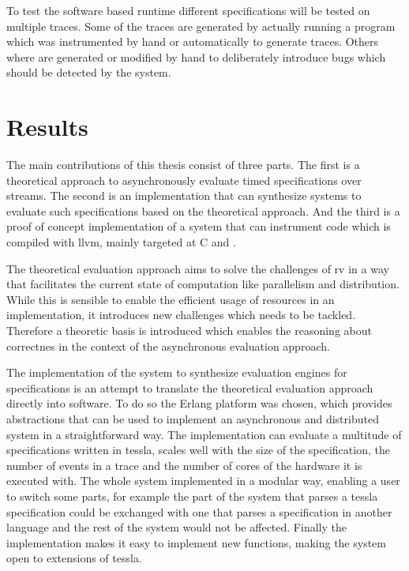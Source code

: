 To test the software based runtime different specifications will be tested on multiple traces.
Some of the traces are generated by actually running a program which was instrumented by hand or automatically to generate traces.
Others where are generated or modified by hand to deliberately introduce bugs which should be detected by the system.

\section{Results}
\label{sec:intro:results}

The main contributions of this thesis consist of three parts.
The first is a theoretical approach to asynchronously evaluate timed specifications over streams.
The second is an implementation that can synthesize systems to evaluate such specifications based on the theoretical approach.
And the third is a proof of concept implementation of a system that can instrument code which is compiled with \gls{llvm}, mainly targeted at C and \CC.

The theoretical evaluation approach aims to solve the challenges of \gls{rv} in a way that facilitates the current state of computation like parallelism and distribution.
While this is sensible to enable the efficient usage of resources in an implementation, it introduces new challenges which needs to be tackled.
Therefore a theoretic basis is introduced which enables the reasoning about correctnes in the context of the asynchronous evaluation approach.

The implementation of the system to synthesize evaluation engines for specifications is an attempt to translate the theoretical evaluation approach directly into software.
To do so the Erlang platform was chosen, which provides abstractions that can be used to implement an asynchronous and distributed system in a straightforward way.
The implementation can evaluate a multitude of specifications written in \gls{tessla}, scales well with the size of the specification, the number of events in a trace and the number of cores of the hardware it is executed with.
The whole system implemented in a modular way, enabling a user to switch some parts, for example the part of the system that parses a \gls{tessla} specification could be exchanged with one that parses a specification in another language and the rest of the system would not be affected.
Finally the implementation makes it easy to implement new functions, making the system open to extensions of \gls{tessla}.

